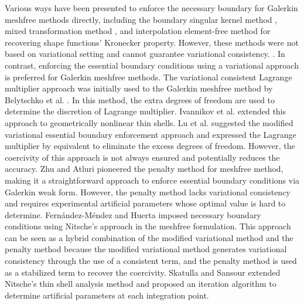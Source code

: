 Various ways have been presented to enforce the necessary boundary for Galerkin meshfree methods directly, including the boundary singular kernel method \cite{chen2000a}, mixed transformation method  \cite{chen2000a}, and interpolation element-free method \cite{liu2019a} for recovering shape functions’ Kronecker property. However, these methods were not based on variational setting and cannot guarantee variational consistency. \DIFdelbegin {}\DIFdelend \DIFaddbegin {}\DIFaddend . In contrast, enforcing the essential boundary conditions using a variational approach is preferred for Galerkin meshfree methods. The variational consistent Lagrange multiplier approach was initially used to the Galerkin meshfree method by Belytschko et al. \cite{belytschko1994}. In this method, the extra degrees of freedom are used to determine the discretion of Lagrange multiplier. Ivannikov et al. \cite{ivannikov2014a} extended this approach to geometrically nonlinear thin shells. Lu et al. \cite{lu1994} suggested the modified variational essential boundary enforcement approach and expressed the Lagrange multiplier by equivalent \DIFdelbegin {}\DIFdelend \DIFaddbegin {}\DIFaddend to eliminate the excess degrees of freedom. However, the coercivity of this approach is not always ensured and potentially reduces the accuracy. Zhu and Atluri \cite{zhu1998} pioneered the penalty method for meshfree method, making it a straightforward approach to enforce essential boundary conditions via Galerkin weak form. However, the penalty method lacks variational consistency and requires experimental artificial parameters whose optimal value is hard to determine. Fernández-Méndez and Huerta \cite{fernandez-mendez2004} imposed necessary boundary conditions using Nitsche's approach in the meshfree formulation. This approach can be seen as a hybrid combination of the modified variational method and the penalty method because the modified variational method generates variational consistency through the use of a consistent term, and the penalty method is used as a stabilized term to recover the coercivity. Skatulla and Sansour \cite{skatulla2008} extended Nitsche’s thin shell analysis method and proposed an iteration algorithm to determine artificial parameters at each integration point\DIFaddbegin {}\DIFaddend .

